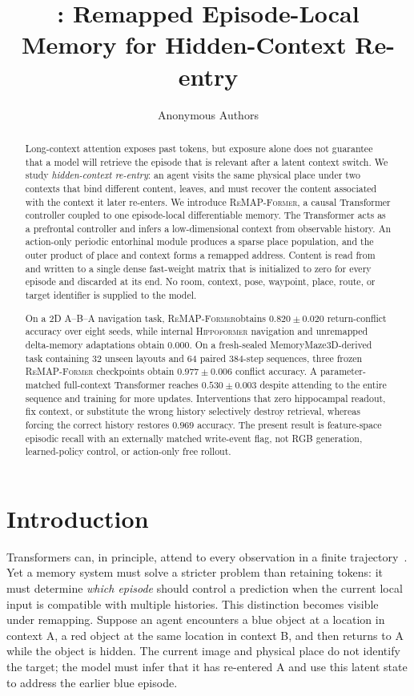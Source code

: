 \documentclass{article}
\title{\model: Remapped Episode-Local Memory for Hidden-Context Re-entry}
\author{Anonymous Authors}
\newcommand{\model}{\textsc{ReMAP-Former}}
\newcommand{\hippo}{\textsc{Hippoformer}}
\begin{document}
\maketitle
{}

\begin{abstract}
Long-context attention exposes past tokens, but exposure alone does not guarantee that a model will retrieve the episode that is relevant after a latent context switch.
We study \emph{hidden-context re-entry}: an agent visits the same physical place under two contexts that bind different content, leaves, and must recover the content associated with the context it later re-enters.
We introduce \model, a causal Transformer controller coupled to one episode-local differentiable memory.
The Transformer acts as a prefrontal controller and infers a low-dimensional context from observable history.
An action-only periodic entorhinal module produces a sparse place population, and the outer product of place and context forms a remapped address.
Content is read from and written to a single dense fast-weight matrix that is initialized to zero for every episode and discarded at its end.
No room, context, pose, waypoint, place, route, or target identifier is supplied to the model.

On a 2D A--B--A navigation task, \model obtains $0.820\pm0.020$ return-conflict accuracy over eight seeds, while internal \hippo{} navigation and unremapped delta-memory adaptations obtain $0.000$.
On a fresh-sealed MemoryMaze3D-derived task containing 32 unseen layouts and 64 paired 384-step sequences, three frozen \model{} checkpoints obtain $0.977\pm0.006$ conflict accuracy.
A parameter-matched full-context Transformer reaches $0.530\pm0.003$ despite attending to the entire sequence and training for more updates.
Interventions that zero hippocampal readout, fix context, or substitute the wrong history selectively destroy retrieval, whereas forcing the correct history restores $0.969$ accuracy.
The present result is feature-space episodic recall with an externally matched write-event flag, not RGB generation, learned-policy control, or action-only free rollout.
\end{abstract}

\section{Introduction}

Transformers can, in principle, attend to every observation in a finite trajectory~\citep{vaswani2017attention}.
Yet a memory system must solve a stricter problem than retaining tokens: it must determine \emph{which episode} should control a prediction when the current local input is compatible with multiple histories.
This distinction becomes visible under remapping.
Suppose an agent encounters a blue object at a location in context A, a red object at the same location in context B, and then returns to A while the object is hidden.
The current image and physical place do not identify the target; the model must infer that it has re-entered A and use this latent state to address the earlier blue episode.
\end{document}
